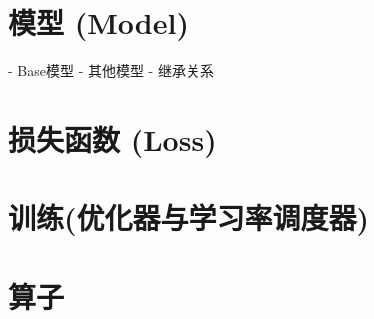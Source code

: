 \documentclass[../main.tex]{subfiles}
\begin{document}
\section{模型 (Model)}\label{code_structure:model}
- Base模型
- 其他模型
- 继承关系
\section{损失函数 (Loss)}\label{code_structure:loss}
\section{训练(优化器与学习率调度器)}\label{code_structure:training}
\section{算子}\label{code_structure:ops}
\end{document}
